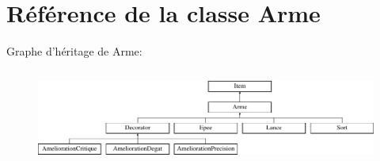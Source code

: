 \hypertarget{classArme}{\section{Référence de la classe Arme}
\label{classArme}
}
Graphe d'héritage de Arme\-:\begin{figure}[H]
\begin{center}
\leavevmode
\includegraphics[height=3.132867cm]{classArme}
\end{center}
\end{figure}
